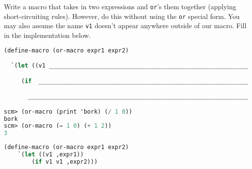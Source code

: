 \question Write a macro that takes in two expressions and \texttt{or}'s
them together (applying short-circuiting rules). However, do this without
using the \texttt{or} special form. You may also assume the name
\texttt{v1} doesn't appear anywhere outside of our macro. Fill in the
implementation below.

\begin{lstlisting}[language=Scheme]
(define-macro (or-macro expr1 expr2)

  `(let ((v1 _____________________________________________________________________________))

     (if  ________________________________________________________________________________

       ___________________________________________________________________________________)))

scm> (or-macro (print 'bork) (/ 1 0))
bork
scm> (or-macro (= 1 0) (+ 1 2))
3
\end{lstlisting}

\begin{solution}
\begin{lstlisting}[language=Scheme]
(define-macro (or-macro expr1 expr2)
    `(let ((v1 ,expr1))
        (if v1 v1 ,expr2)))
\end{lstlisting}
\end{solution}
